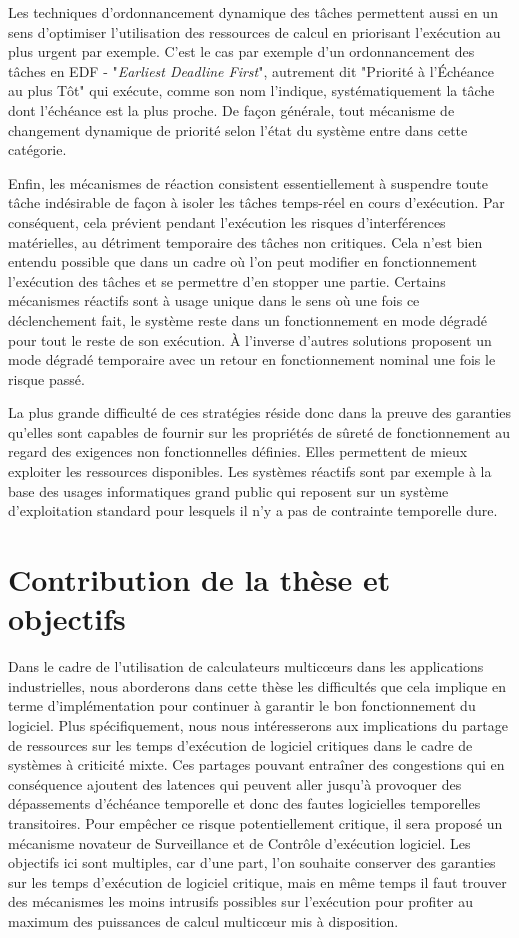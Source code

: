 \documentclass[french, a4paper, 11pt, twoside, pdftex]{StyleThese}
\begin{document}
		Les techniques d'ordonnancement dynamique des tâches permettent aussi en un sens d'optimiser l'utilisation des ressources de calcul en priorisant l'exécution au plus urgent par exemple. C'est le cas par exemple d'un ordonnancement des tâches en EDF - "\textit{Earliest Deadline First}", autrement dit "Priorité à l'Échéance au plus Tôt" qui exécute, comme son nom l'indique, systématiquement la tâche dont l'échéance est la plus proche. De façon générale, tout mécanisme de changement dynamique de priorité selon l'état du système entre dans cette catégorie.
		
		Enfin, les mécanismes de réaction consistent essentiellement à suspendre toute tâche indésirable de façon à isoler les tâches temps-réel en cours d'exécution. Par conséquent, cela prévient pendant l'exécution les risques d'interférences matérielles, au détriment temporaire des tâches non critiques. Cela n'est bien entendu possible que dans un cadre où l'on peut modifier en fonctionnement l'exécution des tâches et se permettre d'en stopper une partie. Certains mécanismes réactifs sont à usage unique dans le sens où une fois ce déclenchement fait, le système reste dans un fonctionnement en mode dégradé pour tout le reste de son exécution. À l'inverse d'autres solutions proposent un mode dégradé temporaire avec un retour en fonctionnement nominal une fois le risque passé. 
		
		La plus grande difficulté de ces stratégies réside donc dans la preuve des garanties qu'elles sont capables de fournir sur les propriétés de sûreté de fonctionnement au regard des exigences non fonctionnelles définies. Elles permettent de mieux exploiter les ressources disponibles. Les systèmes réactifs sont par exemple à la base des usages informatiques grand public qui reposent sur un système d'exploitation standard pour lesquels il n'y a pas de contrainte temporelle dure.


\section{Contribution de la thèse et objectifs}

	Dans le cadre de l'utilisation de calculateurs multicœurs dans les applications industrielles, nous aborderons dans cette thèse les difficultés que cela implique en terme d'implémentation pour continuer à garantir le bon fonctionnement du logiciel. Plus spécifiquement, nous nous intéresserons aux implications du partage de ressources sur les temps d'exécution de logiciel critiques dans le cadre de systèmes à criticité mixte. Ces partages pouvant entraîner des congestions qui en conséquence ajoutent des latences qui peuvent aller jusqu'à provoquer des dépassements d'échéance temporelle et donc des fautes logicielles temporelles transitoires. Pour empêcher ce risque potentiellement critique, il sera proposé un mécanisme novateur de Surveillance et de Contrôle d'exécution logiciel. Les objectifs ici sont multiples, car d'une part, l'on souhaite conserver des garanties sur les temps d'exécution de logiciel critique, mais en même temps il faut trouver des mécanismes les moins intrusifs possibles sur l'exécution pour profiter au maximum des puissances de calcul multicœur mis à disposition. 
	
\end{document}
